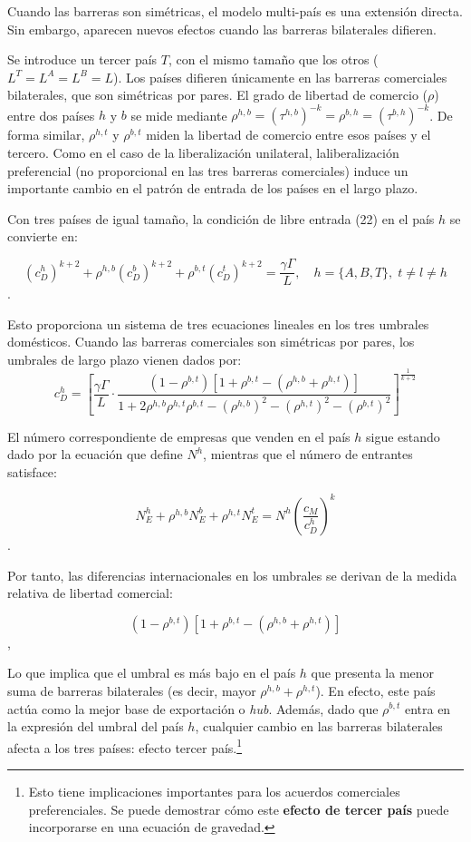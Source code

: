 \documentclass[10pt,a4paper]{article}
\begin{document}
Cuando las barreras son simétricas, el modelo multi-país es una extensión directa. Sin embargo, aparecen nuevos efectos cuando las barreras bilaterales difieren.

Se introduce un tercer país $T$, con el mismo tamaño que los otros ($L^T= L^A = L^B=L$). Los países difieren únicamente en las barreras comerciales bilaterales, que son simétricas por pares. El grado de libertad de comercio ($\rho$) entre dos países $h$ y $b$ se mide mediante $\rho^{h,b}=\left(\tau^{h,b}\right)^{-k}=\rho^{b,h}=\left(\tau^{b,h}\right)^{-k}$. De forma similar, $\rho^{h,t}$ y $\rho^{b,t}$ miden la libertad de comercio entre esos países y el tercero. Como en el caso de la liberalización unilateral, laliberalización preferencial (no proporcional en las tres barreras comerciales) induce un importante cambio en el patrón de entrada de los países en el largo plazo. 

Con tres países de igual tamaño, la condición de libre entrada (22) en el país $h$ se convierte en:

$$(c_D^h)^{k+2} + \rho^{h,b}(c_D^b)^{k+2} + \rho^{b,t}(c_D^t)^{k+2} = \frac{\gamma\Gamma}{L}, \quad h = \{A, B, T\}, \; t \neq l \neq h$$.

Esto proporciona un sistema de tres ecuaciones lineales en los tres umbrales domésticos. Cuando las barreras comerciales son simétricas por pares, los umbrales de largo plazo vienen dados por:
$$c_D^h = \left[\frac{\gamma\Gamma}{L}\cdot\frac{(1 - \rho^{b,t})[1+\rho^{b,t}-(\rho^{h,b}+\rho^{h,t})]}{1 + 2\rho^{h,b}\rho^{h,t}\rho^{b,t} - (\rho^{h,b})^2 - (\rho^{h,t})^2 - (\rho^{b,t})^2}\right]^{\frac{1}{k+2}}$$

El número correspondiente de empresas que venden en el país $h$ sigue estando dado por la ecuación que define $N^h$, mientras que el número de entrantes satisface:

$$N_E^h + \rho^{h,b} N_E^b + \rho^{h,t} N_E^t = N^h \left(\frac{c_M}{c_D^h}\right)^k$$.

Por tanto, las diferencias internacionales en los umbrales se derivan de la medida relativa de libertad comercial:

$$\left(1 - \rho^{b,t}\right)\left[1 + \rho^{b,t} - (\rho^{h,b} + \rho^{h,t})\right]$$,

Lo que implica que el umbral es más bajo en el país $h$ que presenta la menor suma de barreras bilaterales (es decir, mayor $\rho^{h,b} + \rho^{h,t}$). En efecto, este país actúa como la mejor base de exportación o \textit{hub}. Además, dado que $\rho^{b,t}$ entra en la expresión del umbral del país $h$, cualquier cambio en las barreras bilaterales afecta a los tres países: efecto tercer país.\footnote{%
    Esto tiene implicaciones importantes para los acuerdos comerciales preferenciales. Se puede demostrar cómo este \textbf{efecto de tercer país} puede incorporarse en una ecuación de gravedad.
}
\end{document}
